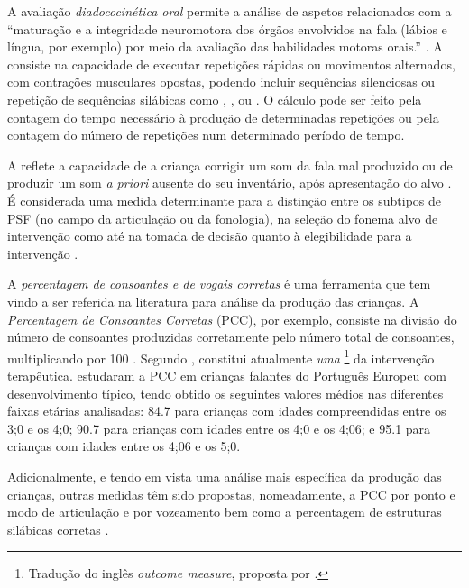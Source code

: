 \documentclass[output=paper]{LSP/langsci}
\begin{document}
A avaliação \textit{diadococinética oral} permite a análise de aspetos relacionados com a “maturação e a integridade neuromotora dos órgãos envolvidos na fala (lábios e língua, por exemplo) por meio da avaliação das habilidades motoras orais.” \citep[131]{paganneveswertzner2010}. A  consiste na capacidade de executar repetições rápidas ou movimentos alternados, com contrações musculares opostas, podendo incluir sequências silenciosas ou repetição de sequências silábicas como \ipa{[pa]}, \ipa{[ta]}, \ipa{[ka]} ou . O cálculo pode ser feito pela contagem do tempo necessário à produção de determinadas repetições ou pela contagem do número de repetições num determinado período de tempo. 

A  reflete a capacidade de a criança corrigir um som da fala mal produzido ou de produzir um som \textit{a priori} ausente do seu inventário, após apresentação do alvo \citep{miccio2002,powellmiccio1996}. É considerada uma medida determinante para a distinção entre os subtipos de PSF (no campo da articulação ou da fonologia), na seleção do fonema alvo de intervenção como até na tomada de decisão quanto à elegibilidade para a intervenção \citep{glaspeystoel2005,lousada_etal2013}. 

A \textit{percentagem de consoantes e de vogais corretas} é uma ferramenta que tem vindo a ser referida na literatura para análise da produção das crianças. A \textit{Percentagem de Consoantes Corretas} (PCC), por exemplo, consiste na divisão do número de consoantes produzidas corretamente pelo número total de consoantes, multiplicando por 100 \citep{shribergkwiatkowski1982}. Segundo \citet{lousada_etal2013}, constitui atualmente \textit{uma }\footnote{Tradução do inglês\textit{ outcome measure}, proposta por \citet{lousada2012}.} da intervenção terapêutica. \citet{jesus_etal2015} estudaram a PCC em crianças falantes do Português Europeu com desenvolvimento típico, tendo obtido os seguintes valores médios nas diferentes faixas etárias analisadas: 84.7 para crianças com idades compreendidas entre os 3;0 e os 4;0; 90.7 para crianças com idades entre os 4;0 e os 4;06; e 95.1 para crianças com idades entre os 4;06 e os 5;0.

Adicionalmente, e tendo em vista uma análise mais específica da produção das crianças, outras medidas têm sido propostas, nomeadamente, a PCC por ponto e modo de articulação e por vozeamento bem como a percentagem de estruturas silábicas corretas \citep{aguilaretal2002,aguilarserra2006}.
\end{document}

